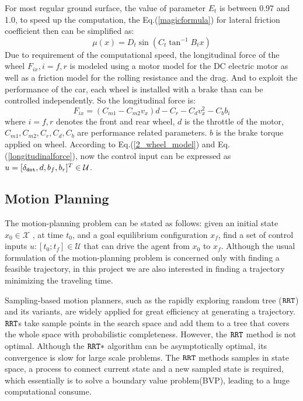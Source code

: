 \documentclass[conference, onecolumn]{IEEEtran}
\begin{document}
For most regular ground surface, the value of parameter $E_t$ is between 0.97 and 1.0\cite{matlabvehicldocumentation}, to speed up the computation, the Eq.(\ref{magicformula}) for lateral friction coefficient then can be simplified as:  
\begin{equation}\label{simplemagicformula}	
	\mu(x)=D_t\sin\left(C_t\tan^{-1}B_tx\right)
\end{equation}
Due to requirement of the computational speed, the longitudinal force of the wheel $F_{ix},i=f,r$ is modeled using a motor model for the DC electric motor as well as a friction model for the rolling resistance and the drag\cite{Liniger2014Optimization}. And to exploit the performance of the car, each wheel is installed with a brake than can be controlled independently. So the longitudinal force is:
\begin{equation}\label{longitudinalforce}	
	F_{ix}=(C_{m1}-C_{m2}v_x)d-C_r-C_dv_x^2-C_bb_i
\end{equation}
where $i=f,r$ denotes the front and rear wheel, $d$ is the throttle of the motor, $C_{m1},C_{m2},C_r,C_d,C_b$ are performance related parameters. $b$ is the brake torque applied on wheel. 
According to Eq.(\ref{2_wheel_model}) and Eq.(\ref{longitudinalforce}), now the control input can be expressed as $u=[\delta_{\tt dot},d,b_f,b_r]^T \in \mathcal{U}$.
\subsection{Motion Planning}
The motion-planning problem can be stated as follows: given an initial state $x_0 \in \mathcal{X}$ , at time $t_0$, and a goal equilibrium configuration $x_f$, find a set of control inputs $ u:[t_0; t_f] \in \mathcal{U}$ that can drive the agent from $x_0$ to $x_f$\cite{TSIANOS20072}. Although the usual formulation of the motion-planning problem is concerned only with finding a feasible trajectory, in this project we are also interested in finding a trajectory minimizing the traveling time.

Sampling-based motion planners, such as the rapidly exploring random tree ($\tt RRT$)\cite{lavalle1998rapidly} and its variants, are widely applied for great efficiency at generating a trajectory. $\tt RRT$s take sample points in the search space and add them to a tree that covers the whole space with probabilistic completeness. However, the $\tt RRT$ method is not optimal. Although the $\tt RRT*$ algorithm can be asymptotically optimal\cite{Karaman2011Sampling}, its convergence is slow for large scale problems. 
The $\tt RRT$ methods samples in state space, a process to connect current state and a new sampled state is required, which essentially is to solve a boundary value problem(BVP), leading to a huge computational consume. 
\end{document}
